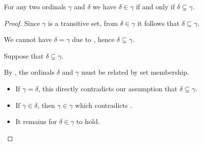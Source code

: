 \begin{proposition}\label{thm:ordinal_ordering_via_subsets}
  For any two ordinals \( \gamma \) and \( \delta \) we have \( \delta \in \gamma \) if and only if \( \delta \subsetneq \gamma \).
\end{proposition}
\begin{proof}
  \NecessitySubProof Since \( \gamma \) is a transitive set, from \( \delta \in \gamma \) it follows that \( \delta \subseteq \gamma \).

  We cannot have \( \delta = \gamma \) due to , hence \( \delta \subsetneq \gamma \).

  \SufficiencySubProof Suppose that \( \delta \subsetneq \gamma \).

  By , the ordinals \( \delta \) and \( \gamma \) must be related by set membership.
  \begin{itemize}
    \item If \( \gamma = \delta \), this directly contradicts our assumption that \( \delta \subsetneq \gamma \).
    \item If \( \gamma \in \delta \), then \( \gamma \in \gamma \) which contradicts .
    \item It remains for \( \delta \in \gamma \) to hold.
  \end{itemize}
\end{proof}

